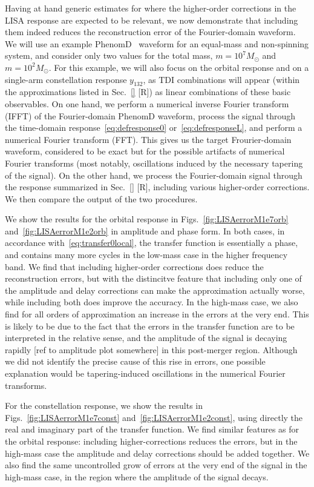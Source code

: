 \documentclass[aps,showpacs,twocolumn,
prd,superscriptaddress,nofootinbib]{revtex4-1}
\newcommand{\Msol}{M_{\odot}}
\newcommand{\SM}[1]{{\color{Red} #1}}
\begin{document}
Having at hand generic estimates for where the higher-order corrections in the LISA response are expected to be relevant, we now demonstrate that including them indeed reduces the reconstruction error of the Fourier-domain waveform. We will use an example PhenomD~\cite{Khan+15,Husa+15} waveform for an equal-mass and non-spinning system, and consider only two values for the total mass, $m=10^{7} \Msol$ and $m=10^{2} \Msol$. For this example, we will also focus on the orbital response and on a single-arm constellation response $y_{132}$, as TDI combinations will appear (within the approximations listed in Sec.~\ref{} \SM{[R]}) as linear combinations of these basic observables. On one hand, we perform a numerical inverse Fourier transform (IFFT) of the Fourier-domain PhenomD waveform, process the signal through the time-domain response~\eqref{eq:defresponse0} or~\eqref{eq:defresponseL}, and perform a numerical Fourier transform (FFT). This gives us the target Frourier-domain waveform, considered to be exact but for the possible artifacts of numerical Fourier transforms (most notably, oscillations induced by the necessary tapering of the signal). On the other hand, we process the Fourier-domain signal through the response summarized in Sec.~\ref{} \SM{[R]}, including various higher-order corrections. We then compare the output of the two procedures.

We show the results for the orbital response in Figs.~\ref{fig:LISAerrorM1e7orb} and~\ref{fig:LISAerrorM1e2orb} in amplitude and phase form. In both cases, in accordance with~\eqref{eq:transfer0local}, the transfer function is essentially a phase, and contains many more cycles in the low-mass case in the higher frequency band. We find that including higher-order corrections does reduce the reconstruction errors, but with the distincitve feature that including only one of the amplitude and delay corrections can make the approximation actually worse, while including both does improve the accuracy. In the high-mass case, we also find for all orders of approximation an increase in the errors at the very end. This is likely to be due to the fact that the errors in the transfer function are to be interpreted in the relative sense, and the amplitude of the signal is decaying rapidly \SM{[ref to amplitude plot somewhere]} in this post-merger region. Although we did not identify the precise cause of this rise in errors, one possible explanation would be tapering-induced oscillations in the numerical Fourier transforms.

For the constellation response, we show the results in Figs.~\ref{fig:LISAerrorM1e7const} and~\ref{fig:LISAerrorM1e2const}, using directly the real and imaginary part of the transfer function. We find similar features as for the orbital response: including higher-corrections reduces the errors, but in the high-mass case the amplitude and delay corrections should be added together. We also find the same uncontrolled grow of errors at the very end of the signal in the high-mass case, in the region where the amplitude of the signal decays.
\end{document}
